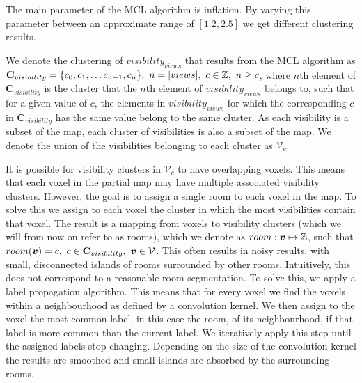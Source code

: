 \documentclass{article}
\begin{document}
The main parameter of the MCL algorithm is inflation. By varying this parameter between an approximate range of \([1.2, 2.5]\) we get different clustering results. 

We denote the clustering of \(visibility_{views}\) that results from the MCL algorithm as \(\mathbf{C}_{visibility} = \{c_0, c_1, \dots c_{n-1}, c_{n}\},\ n=|views|,\ c \in \mathbb{Z},\ n \geq c\), where \(n\)th element of \(\mathbf{C}_{visibility}\) is the cluster that the \(n\)th element of \(visibility_{views}\) belongs to, such that for a given value of \(c\), the elements in \(visibility_{views}\) for which the corresponding \(c\) in \(\mathbf{C}_{visibility}\) has the same value belong to the same cluster. As each visibility is a subset of the map, each cluster of visibilities is also a subset of the map. We denote the union of the visibilities belonging to each cluster as \(\mathcal{V}_{c}\). 

It is possible for visibility clusters in \(\mathcal{V}_{c}\) to have overlapping voxels. This means that each voxel in the partial map may have multiple associated visibility clusters. However, the goal is to assign a single room to each voxel in the map. To solve this we assign to each voxel the cluster in which the most visibilities contain that voxel. The result is a mapping from voxels to visibility clusters (which we will from now on refer to as rooms), which we denote as \(room: \boldsymbol{v} \mapsto \mathbb{Z}\), such that \(room(\boldsymbol{v}) = c,\ c \in \mathbf{C}_{visibility},\ \boldsymbol{v} \in \mathcal{V}\). This often results in noisy results, with small, disconnected islands of rooms surrounded by other rooms. Intuitively, this does not correspond to a reasonable room segmentation. To solve this, we apply a label propagation algorithm. This means that for every voxel we find the voxels within a neighbourhood as defined by a convolution kernel. We then assign to the voxel the most common label, in this case the room, of its neighbourhood, if that label is more common than the current label. We iteratively apply this step until the assigned labels stop changing. Depending on the size of the convolution kernel the results are smoothed and small islands are absorbed by the surrounding rooms.
\end{document}
